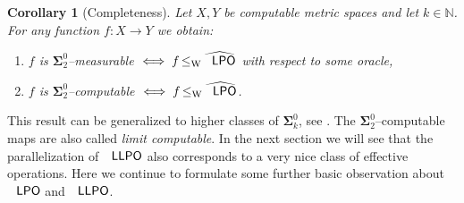 \documentclass[jsl,10pt]{noasl}
\def\IN{{\mathbb{N}}}
\newcommand{\SO}[1]{{{\boldsymbol\Sigma}^0_{#1}}}
\def\LPO{\text{\rm\sffamily LPO}}
\def\LLPO{\text{\rm\sffamily LLPO}}
\def\LPO{\text{\rm\sffamily LPO}}
\def\LLPO{\text{\rm\sffamily LLPO}}
\def\leqW{\mathop{\leq_{\mathrm{W}}}}
\newtheorem{corollary}[proposition]{Corollary}
\begin{document}
\begin{corollary}[Completeness]
\label{cor:completeness}
Let $X,Y$ be computable metric spaces and let $k\in\IN$.
For any function $f:X\to Y$ we obtain:
\begin{enumerate}
\item $f$ is $\SO{2}$--measurable $\iff f\leqW\widehat{\LPO}$ with respect to some oracle,
\item $f$ is $\SO{2}$--computable $\iff f\leqW\widehat{\LPO}$.
\end{enumerate}
\end{corollary}

This result can be generalized to higher classes of $\SO{k}$, see \cite{Bra05}.
The $\SO{2}$--computable maps are also called {\em limit computable}.
In the next section we will see that the parallelization of $\LLPO$ 
also corresponds to a very nice class of effective operations.
Here we continue to formulate some further basic observation 
about $\LPO$ and $\LLPO$.
\end{document}
